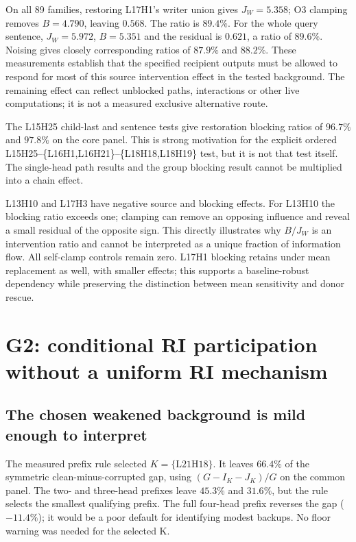 On all 89 families, restoring L17H1's writer union gives $J_W=5.358$; O3 clamping removes $B=4.790$, leaving $0.568$. The ratio is $89.4\%$. For the whole query sentence, $J_W=5.972$, $B=5.351$ and the residual is $0.621$, a ratio of $89.6\%$. Noising gives closely corresponding ratios of $87.9\%$ and $88.2\%$. These measurements establish that the specified recipient outputs must be allowed to respond for most of this source intervention effect in the tested background. The remaining effect can reflect unblocked paths, interactions or other live computations; it is not a measured exclusive alternative route.

The L15H25 child-last and sentence tests give restoration blocking ratios of $96.7\%$ and $97.8\%$ on the core panel. This is strong motivation for the explicit ordered L15H25--\{L16H1,L16H21\}--\{L18H18,L18H19\} test, but it is not that test itself. The single-head path results and the group blocking result cannot be multiplied into a chain effect.

L13H10 and L17H3 have negative source and blocking effects. For L13H10 the blocking ratio exceeds one; clamping can remove an opposing influence and reveal a small residual of the opposite sign. This directly illustrates why $B/J_W$ is an intervention ratio and cannot be interpreted as a unique fraction of information flow. All self-clamp controls remain zero. L17H1 blocking retains under mean replacement as well, with smaller effects; this supports a baseline-robust dependency while preserving the distinction between mean sensitivity and donor rescue.
\FloatBarrier

\section{G2: conditional RI participation without a uniform RI mechanism}
\label{sec:s42_g2}
\subsection{The chosen weakened background is mild enough to interpret}
The measured prefix rule selected $K=\{\mathrm{L21H18}\}$. It leaves $66.4\%$ of the symmetric clean-minus-corrupted gap, using $(G-I_K-J_K)/G$ on the common panel. The two- and three-head prefixes leave $45.3\%$ and $31.6\%$, but the rule selects the smallest qualifying prefix. The full four-head prefix reverses the gap ($-11.4\%$); it would be a poor default for identifying modest backups. No floor warning was needed for the selected K.

